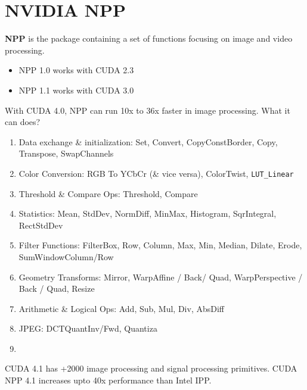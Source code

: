 
\chapter{NVIDIA NPP}
\label{chap:nvidia-npp}

{\bf NPP} is the package containing a set of functions focusing on
image and video processing. 
\begin{itemize}
\item NPP 1.0 works with CUDA 2.3
\item NPP 1.1 works with CUDA 3.0
\end{itemize}

With CUDA 4.0, NPP can run 10x to 36x faster in image processing. What it can
does?
\begin{enumerate}
  \item Data exchange \& initialization: Set, Convert, CopyConstBorder, Copy, 
Transpose, SwapChannels
  \item Color Conversion: RGB To YCbCr (\& vice versa), 
ColorTwist, \verb!LUT_Linear!
  \item Threshold \& Compare Ops: Threshold, Compare
  \item Statistics: Mean, StdDev, NormDiff, MinMax, 
Histogram, SqrIntegral, RectStdDev
  \item Filter Functions: FilterBox, Row, Column, Max, Min, Median, 
Dilate, Erode, SumWindowColumn/Row
  \item Geometry Transforms:
Mirror, WarpAffine / Back/ Quad, 
WarpPerspective / Back / Quad, Resize
  \item Arithmetic \& Logical Ops:
Add, Sub, Mul, Div, AbsDiff
\item JPEG:
DCTQuantInv/Fwd, Quantiza
  \item 
\end{enumerate}

CUDA 4.1 has +2000 image processing and signal processing primitives.
CUDA NPP 4.1 increases upto 40x performance than Intel
IPP. 


